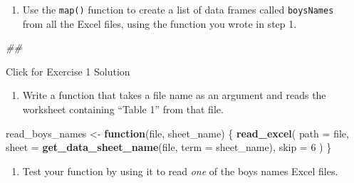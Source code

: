 \documentclass[]{book}
\newenvironment{Shaded}{\begin{snugshade}}{\end{snugshade}}
\newcommand{\CommentTok}[1]{\textcolor[rgb]{0.56,0.35,0.01}{\textit{#1}}}
\newcommand{\ControlFlowTok}[1]{\textcolor[rgb]{0.13,0.29,0.53}{\textbf{#1}}}
\newcommand{\DataTypeTok}[1]{\textcolor[rgb]{0.13,0.29,0.53}{#1}}
\newcommand{\DecValTok}[1]{\textcolor[rgb]{0.00,0.00,0.81}{#1}}
\newcommand{\KeywordTok}[1]{\textcolor[rgb]{0.13,0.29,0.53}{\textbf{#1}}}
\newcommand{\NormalTok}[1]{#1}
\newcommand{\OperatorTok}[1]{\textcolor[rgb]{0.81,0.36,0.00}{\textbf{#1}}}
\newcommand{\StringTok}[1]{\textcolor[rgb]{0.31,0.60,0.02}{#1}}
\providecommand{\tightlist}{%
  \setlength{\itemsep}{0pt}\setlength{\parskip}{0pt}}
\begin{document}
\begin{enumerate}
\def\labelenumi{\arabic{enumi}.}
\setcounter{enumi}{2}
\tightlist
\item
  Use the \texttt{map()} function to create a list of data frames called \texttt{boysNames}\\
  from all the Excel files, using the function you wrote in step 1.
\end{enumerate}

\begin{Shaded}
\begin{Highlighting}[]
\CommentTok{## }
\end{Highlighting}
\end{Shaded}

{Click for Exercise 1 Solution}

\begin{enumerate}
\def\labelenumi{\arabic{enumi}.}
\tightlist
\item
  Write a function that takes a file name as an argument and reads the worksheet containing ``Table 1'' from that file.
\end{enumerate}

\begin{Shaded}
\begin{Highlighting}[]
\NormalTok{read_boys_names <-}\StringTok{ }\ControlFlowTok{function}\NormalTok{(file, sheet_name) \{}
  \KeywordTok{read_excel}\NormalTok{(}
    \DataTypeTok{path =}\NormalTok{ file,}
    \DataTypeTok{sheet =} \KeywordTok{get_data_sheet_name}\NormalTok{(file, }\DataTypeTok{term =}\NormalTok{ sheet_name),}
    \DataTypeTok{skip =} \DecValTok{6}
\NormalTok{  )}
\NormalTok{\}}
\end{Highlighting}
\end{Shaded}

\begin{enumerate}
\def\labelenumi{\arabic{enumi}.}
\setcounter{enumi}{1}
\tightlist
\item
  Test your function by using it to read \emph{one} of the boys names Excel files.
\end{enumerate}

\begin{Shaded}
\end{Shaded}
\end{document}
